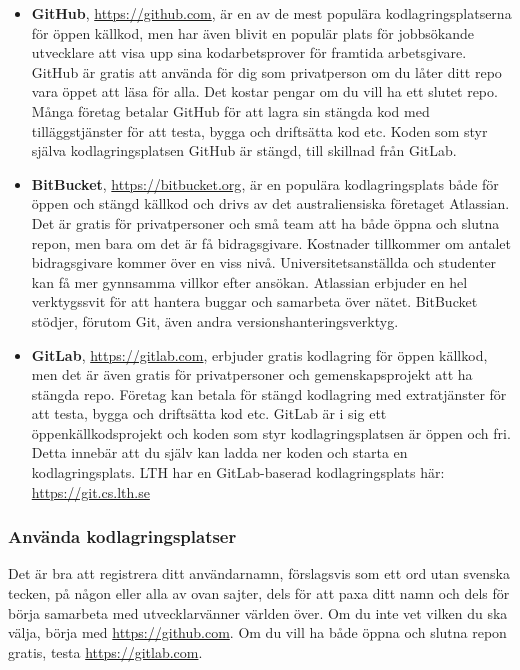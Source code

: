 \begin{itemize}
\item  \textbf{GitHub}, \url{https://github.com}, är en av de mest populära kodlagringsplatserna för öppen källkod, men har även blivit en populär plats för jobbsökande utvecklare att visa upp sina  kodarbetsprover för framtida arbetsgivare. GitHub är gratis att använda för dig som privatperson om du låter ditt repo vara öppet att läsa för alla. Det kostar pengar om du vill ha ett slutet repo. Många företag betalar GitHub för att lagra sin stängda kod med tilläggstjänster för att testa, bygga och driftsätta kod etc. Koden som styr själva kodlagringsplatsen GitHub är stängd, till skillnad från GitLab.

\item \textbf{BitBucket}, \url{https://bitbucket.org}, är en populära kodlagringsplats både för öppen och stängd källkod och drivs av det australiensiska företaget Atlassian. Det är gratis för privatpersoner och små team att ha både öppna och slutna repon, men bara om det är få bidragsgivare. Kostnader tillkommer om antalet bidragsgivare kommer över en viss nivå. Universitetsanställda och studenter kan få mer gynnsamma villkor efter ansökan. Atlassian erbjuder en hel verktygssvit för att hantera buggar och samarbeta över nätet. BitBucket stödjer, förutom Git, även andra versionshanteringsverktyg.

\item \textbf{GitLab}, \url{https://gitlab.com}, erbjuder gratis kodlagring för öppen källkod, men det är även gratis för privatpersoner och gemenskapsprojekt att ha stängda repo. Företag kan betala för stängd kodlagring med extratjänster för att testa, bygga och driftsätta kod etc. GitLab är i sig ett öppenkällkodsprojekt och koden som styr kodlagringsplatsen är öppen och fri. Detta innebär att du själv kan ladda ner koden och starta en kodlagringsplats. LTH har en GitLab-baserad kodlagringsplats här: \url{https://git.cs.lth.se}

\end{itemize}

\subsubsection{Använda kodlagringsplatser}

Det är bra att registrera ditt användarnamn, förslagsvis  som ett ord utan svenska tecken, på någon eller alla av ovan sajter, dels för att paxa ditt namn och dels för börja samarbeta med utvecklarvänner världen över. Om du inte vet vilken du ska välja, börja med \url{https://github.com}. Om du vill ha både öppna och slutna repon gratis, testa \url{https://gitlab.com}. 

